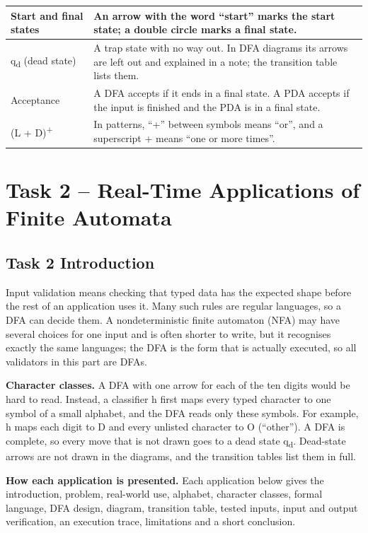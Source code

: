 \documentclass[12pt,a4paper]{article}
\begin{document}
{\begin{longtable}{|>{\raggedright\arraybackslash}p{}|>{\raggedright\arraybackslash}p{}|}
Start and final states & An arrow with the word ``start'' marks the start state; a double circle marks a final state.\\ \hline
q\textsubscript{d} (dead state) & A trap state with no way out. In DFA diagrams its arrows are left out and explained in a note; the transition table lists them.\\ \hline
Acceptance & A DFA accepts if it ends in a final state. A PDA accepts if the input is finished and the PDA is in a final state.\\ \hline
(L + D)\textsuperscript{+} & In patterns, ``+'' between symbols means ``or'', and a superscript + means ``one or more times''.\\ \hline
\end{longtable}}

\section{Task 2 -- Real-Time Applications of Finite Automata}

\subsection{Task 2 Introduction}

Input validation means checking that typed data has the expected shape before the rest of an application uses it. Many such rules are regular languages, so a DFA can decide them. A nondeterministic finite automaton (NFA) may have several choices for one input and is often shorter to write, but it recognises exactly the same languages; the DFA is the form that is actually executed, so all validators in this part are DFAs.

\textbf{Character classes.} A DFA with one arrow for each of the ten digits would be hard to read. Instead, a classifier h first maps every typed character to one symbol of a small alphabet, and the DFA reads only these symbols. For example, h maps each digit to D and every unlisted character to O (``other''). A DFA is complete, so every move that is not drawn goes to a dead state q\textsubscript{d}. Dead-state arrows are not drawn in the diagrams, and the transition tables list them in full.

\textbf{How each application is presented.} Each application below gives the introduction, problem, real-world use, alphabet, character classes, formal language, DFA design, diagram, transition table, tested inputs, input and output verification, an execution trace, limitations and a short conclusion.
\end{document}
